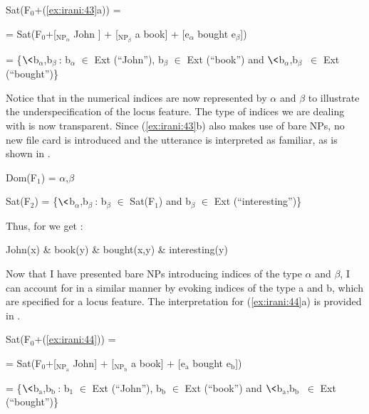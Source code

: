 \documentclass[output=paper,
modfonts
]{langscibook}
\begin{document}
\ea \label{ex:irani:57} 
Sat(F$_0$+(\ref{ex:irani:43}a)) = \par 
= Sat(F$_0$+[$_{\text{NP}_\alpha}$ John ] + [$_{\text{NP}_\beta}$ a book] + [e$_{\alpha}$ bought e$_{\beta}$]) \par 
= \{$\<$b$_{\alpha}$,b$_{\beta}\>$: b$_{\alpha}$ \(\in\) Ext (``John''), b$_{\beta}$ \(\in\) Ext (``book'') and $\<$b$_{\alpha}$,b$_{\beta}\>$ \(\in\) Ext (``bought'')\} \par 
\z 


Notice that in  the numerical indices are now represented by \(\alpha\) and \(\beta\) to illustrate the underspecification of the locus feature. The type of indices we are dealing with is now transparent. Since (\ref{ex:irani:43}b) also makes use of bare NPs, no new file card is introduced and the utterance is interpreted as familiar, as is shown in . \newpage 

\begin{exe} 

\ex \label{ex:irani:58} Dom(F$_1$) = {$\alpha$,$\beta$} \par 
Sat(F$_2$) = \{$\<$b$_{\alpha}$,b$_{\beta}\>$: b$_{\beta}$ \(\in\) Sat(F$_1$) and b$_{\beta}$ \(\in\) Ext (``interesting'')\} \par 

\end{exe}

Thus, for  we get :

\begin{exe}

\ex\label{ex:irani:59} John(x) \& book(y) \& bought(x,y) \& interesting(y)

\end{exe}

Now that I have presented bare NPs introducing indices of the type \(\alpha\) and \(\beta\), I can account for  in a similar manner by evoking indices of the type a and b, which are specified for a locus feature.  The interpretation for (\ref{ex:irani:44}a) is provided in .

\begin{exe} 

\ex\label{ex:irani:60} Sat(F$_0$+(\ref{ex:irani:44})) = \par 
= Sat(F$_0$+[$_{\text{NP}_\text{a}}$ John] + [$_{\text{NP}_\text{b}}$ a book] + [e$_\text{a}$ bought e$_\text{b}$])\par 
= \{$\<$b$_\text{a}$,b$_\text{b}\>$: b$_1$ \(\in\) Ext (``John''), b$_\text{b}$ \(\in\) Ext (``book'') and $\<$b$_\text{a}$,b$_\text{b}\>$ \(\in\) Ext \\ (``bought'')\}  

\end{exe}
\end{document}
